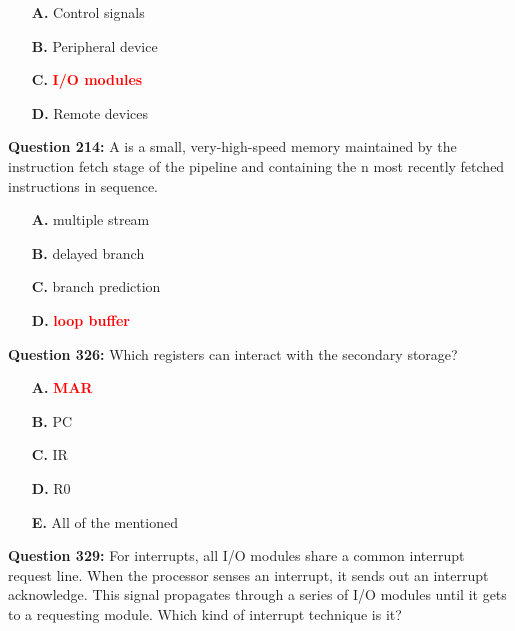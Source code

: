\documentclass[12pt,a4paper]{article}
\begin{document}
\begin{itemize}
    \item[\textbf{A.}] Control signals
    \item[\textbf{B.}] Peripheral device
    \item[\textbf{C.}] \textcolor{red}{\textbf{I/O modules}}
    \item[\textbf{D.}] Remote devices
\end{itemize}

\vspace{0.5cm}

\vspace{0.5cm}

\textbf{Question 214:} A \underline{\hspace{1.5cm}} is a small, very-high-speed memory maintained by the instruction fetch stage of the pipeline and containing the n most recently fetched instructions in sequence.

\begin{itemize}
    \item[\textbf{A.}] multiple stream
    \item[\textbf{B.}] delayed branch
    \item[\textbf{C.}] branch prediction
    \item[\textbf{D.}] \textcolor{red}{\textbf{loop buffer}}
\end{itemize}

\vspace{0.5cm}

\vspace{0.5cm}

\textbf{Question 326:} Which registers can interact with the secondary storage?

\begin{itemize}
    \item[\textbf{A.}] \textcolor{red}{\textbf{MAR}}
    \item[\textbf{B.}] PC
    \item[\textbf{C.}] IR
    \item[\textbf{D.}] R0
    \item[\textbf{E.}] All of the mentioned
\end{itemize}

\vspace{0.5cm}

\vspace{0.5cm}

\textbf{Question 329:} For interrupts, all I/O modules share a common interrupt request line. When the processor senses an interrupt, it sends out an interrupt acknowledge. This signal propagates through a series of I/O modules until it gets to a requesting module. Which kind of interrupt technique is it?
\end{document}
